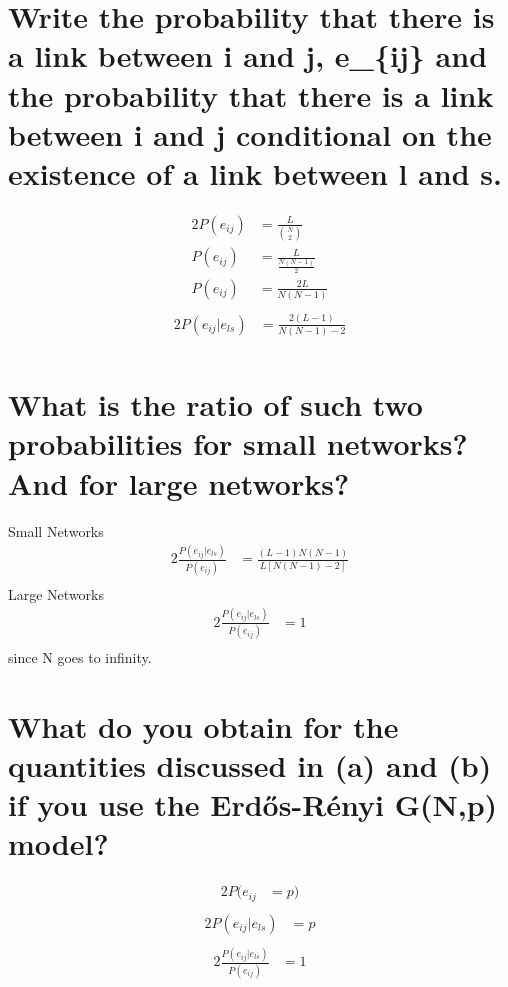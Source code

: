 \documentclass{article}%
\begin{document}
%
\normalsize%
\section{Write the probability that there is a link between i and j, e\_\{ij\} and the probability that there is a link between i and j conditional on the existence of a link between l and s.}%
\label{sec:Writetheprobabilitythatthereisalinkbetweeniandj,eijandtheprobabilitythatthereisalinkbetweeniandjconditionalontheexistenceofalinkbetweenlands.}%
\begin{alignat*}{2}%
P(e_{ij}) &= \frac{L}{{N \choose 2}}\\%
P(e_{ij}) &= \frac{L}{\frac{N(N-1)}{2}}\\%
P(e_{ij}) &= \frac{2L}{N(N-1)}\\%
\end{alignat*}%
\begin{alignat*}{2}%
P(e_{ij}|e_{ls}) &= \frac{2(L-1)}{N(N-1)-2}\\%
\end{alignat*}

%
\section{What is the ratio of such two probabilities for small networks? And for large networks?}%
\label{sec:Whatistheratioofsuchtwoprobabilitiesforsmallnetworks?Andforlargenetworks?}%
Small Networks%
\begin{alignat*}{2}%
\frac{P(e_{ij}|e_{ls})}{P(e_{ij})} &= \frac{(L-1)N(N-1)}{L[N(N-1)-2]}\\%
\end{alignat*}%
Large Networks%
\begin{alignat*}{2}%
\frac{P(e_{ij}|e_{ls})}{P(e_{ij})} &= 1\\%
\end{alignat*}%
since N goes to infinity.

%
\section{What do you obtain for the quantities discussed in (a) and (b) if you use the Erdős{-}Rényi G(N,p) model?}%
\label{sec:Whatdoyouobtainforthequantitiesdiscussedin(a)and(b)ifyouusetheErds{-}RnyiG(N,p)model?}%
\begin{alignat*}{2}%
P(e_{ij} &= p)\\%
\end{alignat*}%
\begin{alignat*}{2}%
P(e_{ij}|e_{ls}) &= p\\%
\end{alignat*}%
\begin{alignat*}{2}%
\frac{P(e_{ij}|e_{ls})}{P(e_{ij})} &= 1\\%
\end{alignat*}
\end{document}
